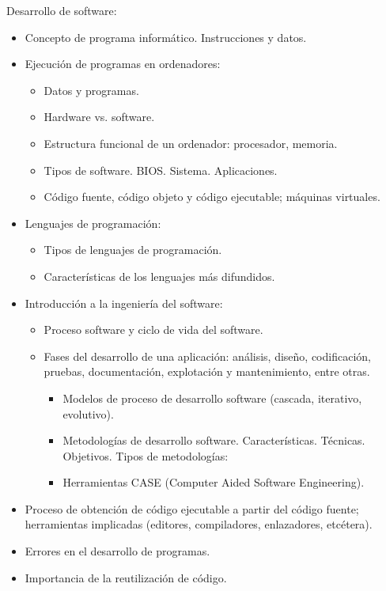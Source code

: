 \documentclass[a4paper]{article}
\begin{document}
Desarrollo de software:
\begin{itemize}
\item Concepto de programa informático. Instrucciones y datos.
\item Ejecución de programas en ordenadores:
\begin{itemize}
\item Datos y programas.
\item Hardware vs. software.
\item Estructura funcional de un ordenador: procesador, memoria.
\item Tipos de software. BIOS. Sistema. Aplicaciones.
\item Código fuente, código objeto y código ejecutable; máquinas virtuales.
\end{itemize}
\item Lenguajes de programación:
\begin{itemize}
\item Tipos de lenguajes de programación.
\item Características de los lenguajes más difundidos.
\end{itemize}
\item Introducción a la ingeniería del software:
\begin{itemize}
\item Proceso software y ciclo de vida del software.
\item Fases del desarrollo de una aplicación: análisis, diseño, codificación, pruebas, documentación, explotación y mantenimiento, entre otras.
\begin{itemize}
\item Modelos de proceso de desarrollo software (cascada, iterativo, evolutivo).
\item Metodologías de desarrollo software. Características. Técnicas. Objetivos. Tipos de metodologías:
\item Herramientas CASE (Computer Aided Software Engineering).
\end{itemize}
\end{itemize}
\item Proceso de obtención de código ejecutable a partir del código fuente; herramientas implicadas (editores, compiladores, enlazadores, etcétera).
\item Errores en el desarrollo de programas.
\item Importancia de la reutilización de código.
\end{itemize}
\end{document}
